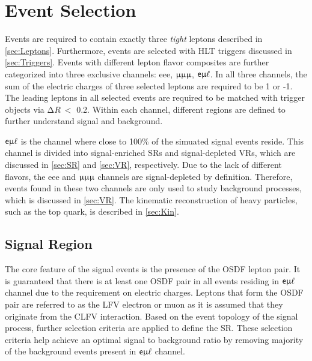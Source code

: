 \chapter{Event Selection}
\label{chap:Selection}

Events are required to contain exactly three \emph{tight} leptons described in \autoref{sec:Leptons}. Furthermore, events are selected with HLT triggers discussed in \autoref{sec:Triggers}. Events with different lepton flavor composites are further categorized into three exclusive channels: eee, $\upmu\upmu\upmu$, $\textsf{e}\upmu\ell$. In all three channels, the sum of the electric charges of three selected leptons are required to be 1 or -1. The leading leptons in all selected events are required to be matched with trigger objects via $\mathrm{\Delta} R~<$ 0.2. Within each channel, different regions are defined to further understand signal and background.

$\textsf{e}\upmu\ell$ is the channel where close to 100\% of the simuated signal events reside. This channel is divided into signal-enriched \acp{SR} and signal-depleted \acp{VR}, which are discussed in \autoref{sec:SR} and \autoref{sec:VR}, respectively. Due to the lack of different flavors, the eee and $\upmu\upmu\upmu$ channels are signal-depleted by definition. Therefore, events found in these two channels are only used to study background processes, which is discussed in \autoref{sec:VR}. The kinematic reconstruction of heavy particles, such as the top quark, is described in \autoref{sec:Kin}.
\section{Signal Region}
\label{sec:SR}

The core feature of the signal events is the presence of the \ac{OSDF} lepton pair. It is guaranteed that there is at least one \ac{OSDF} pair in all events residing in $\textsf{e}\upmu\ell$ channel due to the requirement on electric charges. Leptons that form the \ac{OSDF} pair are referred to as the LFV electron or muon as it is assumed that they originate from the \ac{CLFV} interaction. Based on the event topology of the signal process, further selection criteria are applied to define the \ac{SR}. These selection criteria help achieve an optimal signal to background ratio by removing majority of the background events present in $\textsf{e}\upmu\ell$ channel. 

